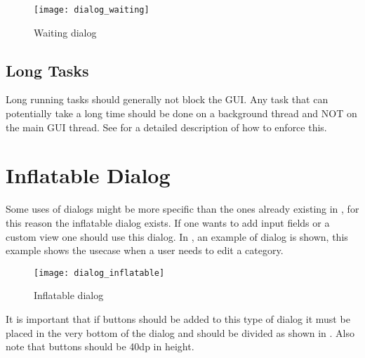 \begin{figure}[h]
	\centering
	\texttt{[image: dialog\_waiting]}
	\caption{Waiting dialog}
	\label{fig:dialog_waiting}
\end{figure}
\FloatBarrier

\subsection{Long Tasks}
\label{sub:long_tasks}
Long running tasks should generally not block the GUI. Any task that can potentially take a long time should be done on a background thread and NOT on the main GUI thread. See  for a detailed description of how to enforce this. 

\section{Inflatable Dialog}
\label{sec:inflatable_dialog}

Some uses of dialogs might be more specific than the ones already existing in \gc, for this reason the inflatable dialog exists. If one wants to add input fields or a custom view one should use this dialog. In , an example of dialog is shown, this example shows the usecase when a user needs to edit a category.

\begin{figure}[h]
	\centering
	\texttt{[image: dialog\_inflatable]}
	\caption{Inflatable dialog}
	\label{fig:inflatable_dialog}
\end{figure}
\FloatBarrier

\begin{note}
	It is important that if buttons should be added to this type of dialog it must be placed in the very bottom of the dialog and should be divided as shown in . Also note that buttons should be 40dp in height.
\end{note}

